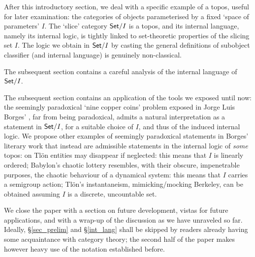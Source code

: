 After this introductory section, we deal with a specific example of a topos, useful for later examination: the categories of objects parameterised by a fixed `space of parameters' $I$. The `slice' category $\mathsf{Set}/I$ is a topos, and its internal language, namely its internal logic, is tightly linked to set-theoretic properties of the slicing set $I$. The logic we obtain in $\mathsf{Set}/I$ by casting the general definitions of subobject classifier (and internal language) is genuinely non-classical.

The subsequent section contains a careful analysis of the internal language of $\mathsf{Set}/I$.

The subsequent section contains an application of the tools we exposed until now: the seemingly paradoxical `nine copper coins' problem exposed in Jorge Luis Borges' \cite{Borges1963}, far from being paradoxical, admits a natural interpretation as a statement in $\mathsf{Set}/I$, for a suitable choice of $I$, and thus of the induced internal logic. We propose other examples of seemingly paradoxical statements in Borges' literary work that instead are admissible statements in the internal logic of \emph{some} topos: on Tl\"on entities may disappear if neglected: this means that $I$ is linearly ordered; Babylon's chaotic lottery resembles, with their obscure, impenetrable purposes, the chaotic behaviour of a dynamical system: this means that $I$ carries a semigroup action; Tl\"on's instantaneism, mimicking/mocking Berkeley, can be obtained assuming $I$ is a discrete, uncountable set.

We close the paper with a section on future development, vistas for future applications, and with a wrap-up of the discussion as we have unraveled so far. Ideally, §\ref{sec_prelim} and §\ref{int_lang} shall be skipped by readers already having some acquaintance with category theory; the second half of the paper makes however heavy use of the notation established before.